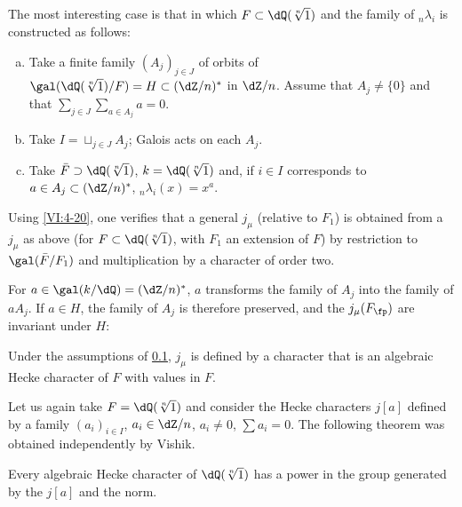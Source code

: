 \subsection{}\label{VI:6-9}

The most interesting case is that in which $F\subset \dQ(\sqrt[n]{1})$ and 
the family of $_n \lambda_i$ is constructed as follows: 
\begin{enumerate}[a)]
  \item Take a finite family $(A_j)_{j\in J}$ of orbits of 
    $\gal(\dQ(\sqrt[n]{1})/F)=H\subset (\dZ/n)^\ast$ in $\dZ/n$. Assume that 
    $A_j\ne\{0\}$ and that $\sum_{j\in J} \sum_{a\in A_j} a=0$. 
\item Take $I=\sqcup_{j\in J} A_j$; Galois acts on each $A_j$. 
  \item Take $\bar F\supset \dQ(\sqrt[n]{1})$, $k=\dQ(\sqrt[n]{1})$ and, if 
    $i\in I$ corresponds to $a\in A_j\subset (\dZ/n)^\ast$, 
    $_n\lambda_i(x)=x^a$. 
\end{enumerate}

Using \ref{VI:4-20}, one verifies that a general $j_\mu$ (relative to 
$F_1$) is obtained from a $j_\mu$ as above (for 
$F\subset \dQ(\sqrt[n]{1})$, with $F_1$ an extension of $F$) by restriction to 
$\gal(\bar F/F_1)$ and multiplication by a character of order two. 

For $a\in \gal(k/\dQ)=(\dZ/n)^\ast$, $a$ transforms the family of $A_j$ 
into the family of $a A_j$. If $a\in H$, the family of $A_j$ is therefore preserved, 
and the $j_\mu(F_\fp)$ are invariant under $H$: 





\begin{proposition_}\label{VI:6-10}
Under the assumptions of \ref{VI:6-9}, $j_\mu$ is defined by a character 
that is an algebraic Hecke character of $F$ with values in $F$. 
\end{proposition_}

Let us again take $F=\dQ(\sqrt[n]{1})$ and consider the Hecke characters 
$j[a]$ defined by a family $(a_i)_{i\in I}$, $a_i\in \dZ/n$, 
$a_i\ne 0$, $\sum a_i=0$. The following theorem was obtained 
independently by Vishik. 





\begin{theorem_}\label{VI:6-11}
Every algebraic Hecke character of $\dQ(\sqrt[n]{1})$ has a power 
in the group generated by the $j[a]$ and the norm. 
\end{theorem_}

